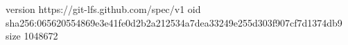 version https://git-lfs.github.com/spec/v1
oid sha256:065620554869e3e41fe0d2b2a212534a7dea33249e255d303f907cf7d1374db9
size 1048672
